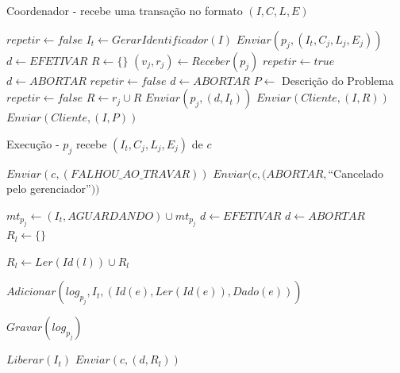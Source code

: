 \documentclass[11pt,twoside,a4paper]{book}
\begin{document}
\begin{algorithm}
    \caption{Coordenador - recebe uma transação no formato $(I, C, L, E)$}
    \label{alg:mini_coordenador}
    \dontprintsemicolon
    \Inicio
    {    
        $repetir \gets false$\;
        {
            $I_t \gets GerarIdentificador(I)$\;
            {
                $Enviar(p_j, (I_t, C_j, L_j, E_j))$\;
            }
            $d \gets EFETIVAR$\;
            $R \gets \{\}$\;
            {
                $(v_j, r_j) \gets Receber(p_j)$\;
                {    
                    $repetir \gets true$\;
                    $d \gets ABORTAR$\;
                }
                {
                    $repetir \gets false$\;
                    $d \gets ABORTAR$\;
                    $P \gets$ Descrição do Problema\;
                }
                \Senao 
                {
                    $repetir \gets false$\;
                    $R \gets r_j \cup R$\;
                }
            }
            {
                $Enviar(p_j, (d, I_t))$\;
            }
        }
        {
            $Enviar(Cliente, (I, R))$\;
        }
        {
            $Enviar(Cliente, (I, P))$\;
        }
    }
\end{algorithm}

\begin{algorithm}
    \caption{Execução - $p_j$ recebe $(I_t, C_j, L_j, E_j)$ de $c$}
    \label{alg:mini_participante1}
    \dontprintsemicolon
    \Inicio
    {
        {
            $Enviar(c, (FALHOU\_AO\_TRAVAR))$\;
        }
        {
            $Enviar(c, (ABORTAR, $``Cancelado pelo gerenciador''$))$\;
        }
        \Senao
        {
            $mt_{p_j} \gets (I_t, AGUARDANDO) \cup mt_{p_j}$\;
            $d \gets EFETIVAR$\;
            {
                {
                    $d \gets ABORTAR$\;
                }
            }
            $R_l \gets \{\}$\;
            {
                {
                    $R_l \gets Ler(Id(l)) \cup R_l$\;
                }
                
                {
                    $Adicionar(log_{p_j}, I_t, (Id(e), Ler(Id(e)), Dado(e)) )$\;
                }

                $Gravar(log_{p_j})$\;
            }
            {
                $Liberar(I_t)$\;
            }
            $Enviar(c, (d, R_l))$\;
        }
    }
\end{algorithm}
\end{document}
